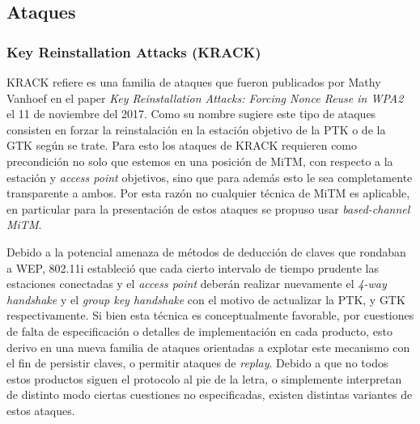 \documentclass[10pt,a4paper]{article}
\begin{document}
\subsection{Ataques}

\subsubsection{Key Reinstallation Attacks (KRACK)}

KRACK refiere es una familia de ataques que fueron publicados por Mathy Vanhoef en el paper \textit{Key Reinstallation Attacks: Forcing Nonce Reuse in WPA2} el 11 de noviembre del 2017. Como su nombre sugiere este tipo de ataques consisten en forzar la reinstalación en la estación objetivo de la PTK o de la GTK según se trate. Para esto los ataques de KRACK requieren como precondición no solo que estemos en una posición de MiTM, con respecto a la estación y \textit{access point} objetivos, sino que para además esto le sea completamente transparente a ambos. Por esta razón no cualquier técnica de MiTM es aplicable, en particular para la presentación de estos ataques se propuso usar \textit{based-channel MiTM}.

Debido a la potencial amenaza de métodos de deducción de claves que rondaban a WEP, 802.11i estableció que cada cierto intervalo de tiempo prudente las estaciones conectadas y el \textit{access point} deberán realizar nuevamente el \textit{4-way handshake} y el \textit{group key handshake} con el motivo de actualizar la PTK, y GTK respectivamente. Si bien esta técnica es conceptualmente favorable, por cuestiones de falta de especificación o detalles de implementación en cada producto, esto derivo en una nueva familia de ataques orientadas a explotar este mecanismo con el fin de persistir claves, o permitir ataques de \textit{replay}. Debido a que no todos estos productos siguen el protocolo al pie de la letra, o simplemente interpretan de distinto modo ciertas cuestiones no especificadas, existen distintas variantes de estos ataques.
\end{document}
